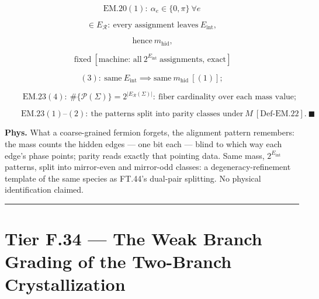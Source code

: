 \begin{theorem}
\[
\mathrm{EM.20}(1):\ \alpha_e\in\{0,\pi\}\ \forall e
\]

\[
\in E_{\mathcal R}:\ \text{every assignment leaves}\ E_{\mathrm{int}},
\]

\[
\ \text{hence}\ m_{\mathrm{hid}},
\]

\[
\ \text{fixed}\ [\text{machine: all}\ 2^{E_{\mathrm{int}}}\ \text{assignments, exact}]
\]

\[
(3):\ \text{same}\ E_{\mathrm{int}}\implies\text{same}\ m_{\mathrm{hid}}\ [(1)];
\]

\[
\qquad \mathrm{EM.23}(4):\ \#\{\mathcal P(\Sigma)\}=2^{|E_{\mathcal R}(\Sigma)|}:\ \text{fiber cardinality over each mass value};
\]

\[
\qquad \mathrm{EM.23}(1)\text{--}(2):\ \text{the patterns split into parity classes under}\ M\ [\mathrm{Def\text{-}EM.22}].\ \blacksquare
\]

\textbf{Phys.} What a coarse-grained fermion forgets, the alignment pattern remembers: the mass counts the hidden edges — one bit each — blind to which way each edge's phase points; parity reads exactly that pointing data. Same mass, $2^{E_{\mathrm{int}}}$ patterns, split into mirror-even and mirror-odd classes: a degeneracy-refinement template of the same species as FT.44's dual-pair splitting. No physical identification claimed.

\vspace{2pt}\noindent\rule{\textwidth}{0.4pt}\vspace{2pt}

\end{theorem}

\section[Tier F.34 — The Weak Branch Grading of the Two-Branch…]{\texorpdfstring{Tier F.34 — The Weak Branch Grading of the Two-Branch Crystallization}{Tier F.34 - The Weak Branch Grading of the Two-Branch Crystallization}}

